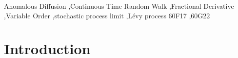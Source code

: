 \documentclass[a4paper,12pt]{elsarticle}
\numberwithin{equation}{section}
\theoremstyle{plain}
\theoremstyle{definition}
\theoremstyle{remark}
\numberwithin{equation}{section}
\newcommand{\1}{\mathbf 1}
\begin{document}
\begin{frontmatter}





\begin{keyword}
Anomalous Diffusion \sep Continuous Time Random Walk \sep Fractional Derivative \sep Variable Order \sep stochastic process limit \sep L\'evy process
\MSC[2010] 60F17 \sep  60G22
\end{keyword}

\end{frontmatter}


\section{Introduction}
\end{document}
